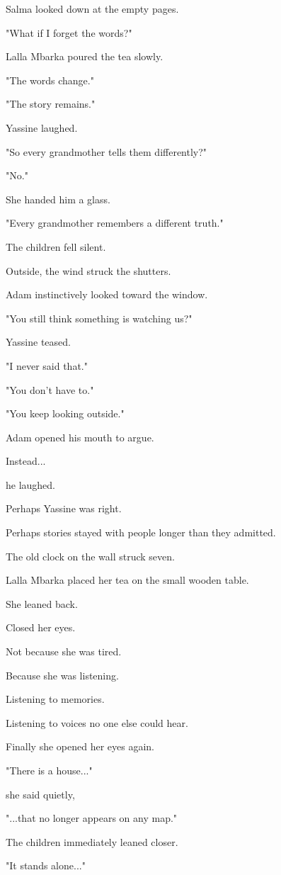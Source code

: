\documentclass[12pt,openany]{book}
\begin{document}
Salma looked down at the empty pages.

"What if I forget the words?"

Lalla Mbarka poured the tea slowly.

"The words change."

"The story remains."

Yassine laughed.

"So every grandmother tells them differently?"

"No."

She handed him a glass.

"Every grandmother remembers a different truth."

The children fell silent.

Outside, the wind struck the shutters.

Adam instinctively looked toward the window.

"You still think something is watching us?"

Yassine teased.

"I never said that."

"You don't have to."

"You keep looking outside."

Adam opened his mouth to argue.

Instead...

he laughed.

Perhaps Yassine was right.

Perhaps stories stayed with people longer than they admitted.

The old clock on the wall struck seven.

Lalla Mbarka placed her tea on the small wooden table.

She leaned back.

Closed her eyes.

Not because she was tired.

Because she was listening.

Listening to memories.

Listening to voices no one else could hear.

Finally she opened her eyes again.

"There is a house..."

she said quietly,

"...that no longer appears on any map."

The children immediately leaned closer.

"It stands alone..."
\end{document}

